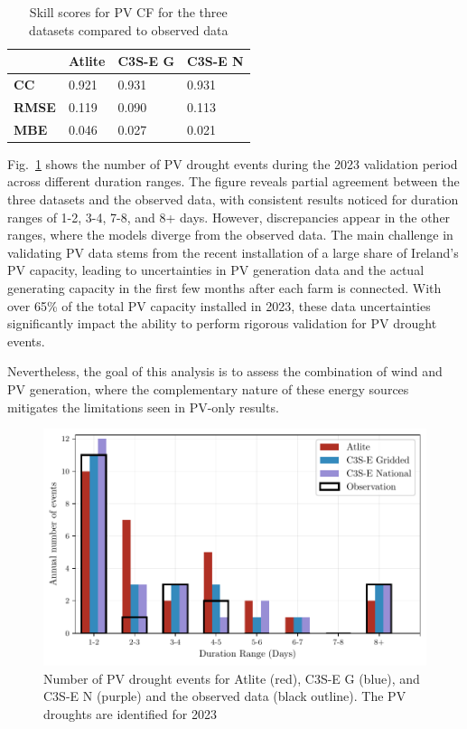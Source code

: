 \documentclass[a4paper, 11p1t]{article}
\begin{document}
\begin{table}[!ht]
	\centering
	\begin{tabular}{l|lll|}
	\cline{2-4}
	& \textbf{Atlite} & \textbf{C3S-E G} & \textbf{C3S-E N} \\ \hline
	\multicolumn{1}{|l|}{\textbf{CC}}   & 0.921           & 0.931            & 0.931            \\ \hline
	\multicolumn{1}{|l|}{\textbf{RMSE}} & 0.119           & 0.090            & 0.113            \\ \hline
	\multicolumn{1}{|l|}{\textbf{MBE}}   & 0.046           & 0.027           & 0.021           \\ \hline
	\end{tabular}
	\caption{Skill scores for PV CF for the three datasets compared to observed data}
	\label{tab:pv_skill_scores}
\end{table}

Fig.~\ref{fig:bar_number_events_verification_pv} shows the number of PV drought events during the 2023 validation period across different duration ranges. The figure reveals partial agreement between the three datasets and the observed data, with consistent results noticed for duration ranges of 1-2, 3-4, 7-8, and 8+ days. However, discrepancies appear in the other ranges, where the models diverge from the observed data. The main challenge in validating PV data stems from the recent installation of a large share of Ireland’s PV capacity, leading to uncertainties in PV generation data and the actual generating capacity in the first few months after each farm is connected. With over 65\% of the total PV capacity installed in 2023, these data uncertainties significantly impact the ability to perform rigorous validation for PV drought events. 

Nevertheless, the goal of this analysis is to assess the combination of wind and PV generation, where the complementary nature of these energy sources mitigates the limitations seen in PV-only results.

\begin{figure}[!ht]
	\centering
	\includegraphics{verification_pv_number_events.pdf}
	\caption{Number of PV drought events for Atlite (red), C3S-E G (blue), and C3S-E N (purple) and the observed data (black outline). The PV droughts are identified for 2023}
	\label{fig:bar_number_events_verification_pv}
\end{figure}
\end{document}
